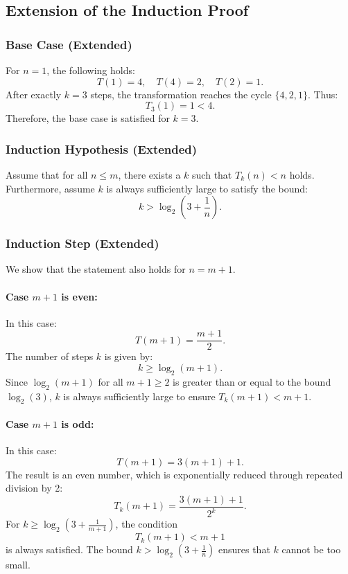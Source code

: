 \documentclass[a4paper,12pt]{article}
\begin{document}
\subsection{Extension of the Induction Proof}
\subsubsection{Base Case (Extended)}
For \( n = 1 \), the following holds:
\[
T(1) = 4, \quad T(4) = 2, \quad T(2) = 1.
\]
After exactly \( k = 3 \) steps, the transformation reaches the cycle \( \{4, 2, 1\} \). Thus:
\[
T_3(1) = 1 < 4.
\]
Therefore, the base case is satisfied for \( k = 3 \).

\subsubsection{Induction Hypothesis (Extended)}
Assume that for all \( n \leq m \), there exists a \( k \) such that \( T_k(n) < n \) holds. Furthermore, assume \( k \) is always sufficiently large to satisfy the bound:
\[
k > \log_2\left(3 + \frac{1}{n}\right).
\]

\subsubsection{Induction Step (Extended)}
We show that the statement also holds for \( n = m + 1 \).

\paragraph{Case \( m + 1 \) is even:}
In this case:
\[
T(m + 1) = \frac{m + 1}{2}.
\]
The number of steps \( k \) is given by:
\[
k \geq \log_2(m + 1).
\]
Since \( \log_2(m + 1) \) for all \( m + 1 \geq 2 \) is greater than or equal to the bound \( \log_2(3) \), \( k \) is always sufficiently large to ensure \( T_k(m + 1) < m + 1 \).

\paragraph{Case \( m + 1 \) is odd:}
In this case:
\[
T(m + 1) = 3(m + 1) + 1.
\]
The result is an even number, which is exponentially reduced through repeated division by 2:
\[
T_k(m + 1) = \frac{3(m + 1) + 1}{2^k}.
\]
For \( k \geq \log_2\left(3 + \frac{1}{m + 1}\right) \), the condition
\[
T_k(m + 1) < m + 1
\]
is always satisfied. The bound \( k > \log_2\left(3 + \frac{1}{n}\right) \) ensures that \( k \) cannot be too small.
\end{document}
